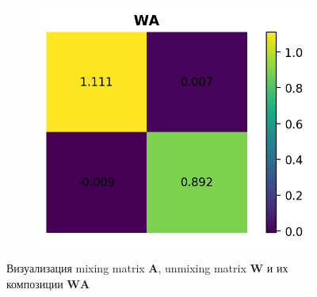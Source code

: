 \documentclass[a4paper,12pt]{article}
\begin{document}
\begin{figure}[h!]
\begin{subfigure}{0.3\linewidth}
		\end{subfigure}
		\begin{subfigure}{0.3\linewidth}
			\includegraphics[width=\linewidth]{plots/WA1}
		\end{subfigure}
		
		\caption{Визуализация mixing matrix $\mathbf{A}$, unmixing matrix $\mathbf{W}$ и их композиции $\mathbf{WA}$}
	\end{figure}
	
\end{document}
